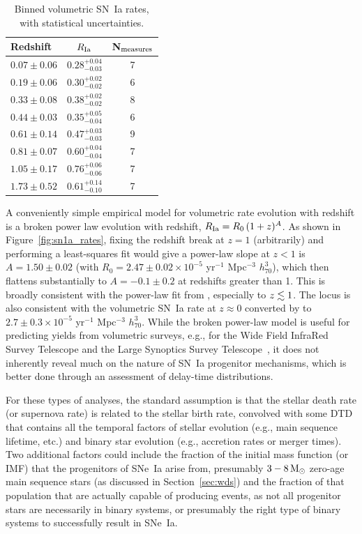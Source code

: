 \documentclass[apj, linenumbers]{aastex62}
\begin{document}
\begin{table}[h]
   \centering
   \caption{Binned volumetric SN~Ia rates, with statistical uncertainties.}
   \begin{tabular}{lcc} 
   \hline
   \hline
   Redshift & $R_{\rm Ia}$\tablenotemark{a}&N$_{\rm measures}$\\
   \hline
$0.07 \pm{0.06}$ & $0.28^{+0.04}_{-0.03}$& 7\\
$0.19 \pm{0.06}$ & $0.30^{+0.02}_{-0.02}$& 6\\
$0.33 \pm{0.08}$ & $0.38^{+0.02}_{-0.02}$& 8\\
$0.44 \pm{0.03}$ & $0.35^{+0.05}_{-0.04}$& 6\\
$0.61 \pm{0.14}$ & $0.47^{+0.03}_{-0.03}$& 9\\
$0.81 \pm{0.07}$ & $0.60^{+0.04}_{-0.04}$& 7\\
$1.05 \pm{0.17}$ & $0.76^{+0.06}_{-0.06}$& 7\\
$1.73 \pm{0.52}$ & $0.61^{+0.14}_{-0.10}$& 7\\
\hline
   \end{tabular}
   \label{tab:sn1a_bin}
\end{table}

A conveniently simple empirical model for volumetric rate evolution with redshift is a broken power law evolution with redshift, $R_{\rm Ia}=R_0\,(1+z)^A$. As shown in Figure~\ref{fig:sn1a_rates}, fixing the redshift break at $z=1$ (arbitrarily) and performing a least-squares fit would give a power-law slope at $z<1$ is $A=1.50\pm0.02$ (with $R_0 = 2.47\pm0.02\times10^{-5}$ yr$^{-1}$ Mpc$^{-3}$ $h_{70}^3$), which then flattens substantially to $A=-0.1\pm0.2$ at redshifts greater than 1. This is broadly consistent with the power-law fit from \cite{Okumura:2014}, especially to $z\lesssim1$. The locus is also consistent with the volumetric SN~Ia rate at $z\approx0$ converted by \cite{Li:2011b} to $2.7\pm0.3\times10^{-5}$ yr$^{-1}$ Mpc$^{-3}$ $h_{70}^3$. While the broken power-law model is useful for predicting yields from volumetric surveys, e.g., for the Wide Field InfraRed Survey Telescope \cite[\textit{WFIRST, }][]{Hounsell:2018fv} and the Large Synoptics Survey Telescope~\cite[\textit{LSST, }][]{Kessler:2019fr}, it does not inherently reveal much on the nature of SN~Ia progenitor mechanisms, which is better done through an assessment of delay-time distributions.

For these types of analyses, the standard assumption is that the stellar death rate (or supernova rate) is related to the stellar birth rate, convolved with some DTD that contains all the temporal factors of stellar evolution (e.g., main sequence lifetime, etc.) and binary star evolution (e.g., accretion rates or merger times). Two additional factors could include the fraction of the initial mass function (or IMF) that the progenitors of SNe~Ia arise from, presumably $3 - 8\, \rm{M}_{\odot}$ zero-age main sequence stars (as discussed in Section~\ref{sec:wds}) and the fraction of that population that are actually capable of producing events, as not all progenitor stars are necessarily in binary systems, or presumably the right type of binary systems to successfully result in SNe~Ia.
\end{document}
